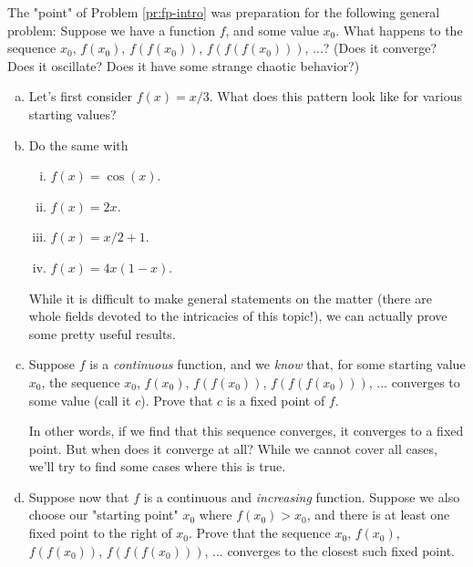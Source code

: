 \begin{problem}
\label{pr:fp-iter}


The "point" of Problem \ref{pr:fp-intro} was preparation for the following general problem: Suppose we have a function $f$, and some value $x_0$. What happens to the sequence $x_0$, $f(x_0)$, $f(f(x_0))$, $f(f(f(x_0)))$, ...? (Does it converge? Does it oscillate? Does it have some strange chaotic behavior?)

\begin{enumerate}[(a)]
\item Let's first consider $f(x) = x/3$. What does this pattern look like for various starting values?
\item Do the same with 
\begin{enumerate}[i.]
\item $f(x) = \cos(x)$.
\item $f(x) = 2x$. 
\item $f(x) = x/2 + 1$. 
\item $f(x) = 4x(1-x)$. %
\end{enumerate} \hfill

While it is difficult to make general statements on the matter (there are whole fields devoted to the intricacies of this topic!), we can actually prove some pretty useful results.


\item Suppose $f$ is a \emph{continuous} function, and we \emph{know} that, for some starting value $x_0$, the sequence $x_0$, $f(x_0)$, $f(f(x_0))$, $f(f(f(x_0)))$, ... converges to some value (call it $c$). Prove that $c$ is a fixed point of $f$.

In other words, if we find that this sequence converges, it converges to a fixed point. But when does it converge at all? While we cannot cover all cases, we'll try to find some cases where this is true.


\item Suppose now that $f$ is a continuous and \emph{increasing} function. Suppose we also choose our "starting point" $x_0$ where $f(x_0) > x_0$, and there is at least one fixed point to the right of $x_0$. Prove that the sequence $x_0$, $f(x_0)$, $f(f(x_0))$, $f(f(f(x_0)))$, ... converges to the closest such fixed point.


\end{enumerate}
\end{problem}
